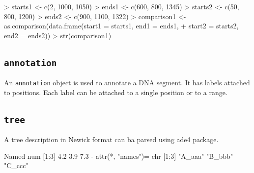 \documentclass[a4paper]{article}
\newcommand{\code}[1]{\texttt{#1}}
\newcommand{\pkg}[1]{{\normalfont\fontseries{b}\selectfont #1}}
\begin{document}
\begin{Schunk}
\begin{Sinput}
> starts1 <- c(2, 1000, 1050)
> ends1 <- c(600, 800, 1345)
> starts2 <- c(50, 800, 1200)
> ends2 <- c(900, 1100, 1322)
> comparison1 <- as.comparison(data.frame(start1 = starts1, end1 = ends1, 
+     start2 = starts2, end2 = ends2))
> str(comparison1)
\end{Sinput}
\end{Schunk}

\subsection{\code{annotation}}

An \code{annotation} object is used to annotate a DNA segment. It has 
labels attached to positions. Each label can be attached to a single 
position or to a range. 

\begin{Schunk}
\end{Schunk}

\subsection{\code{tree}}

A tree description in Newick format can ba parsed using \pkg{ade4} package.
\begin{Schunk}
\begin{Soutput}
 Named num [1:3] 4.2 3.9 7.3
 - attr(*, "names")= chr [1:3] "A_aaa" "B_bbb" "C_ccc"
\end{Soutput}
\end{Schunk}
\end{document}
